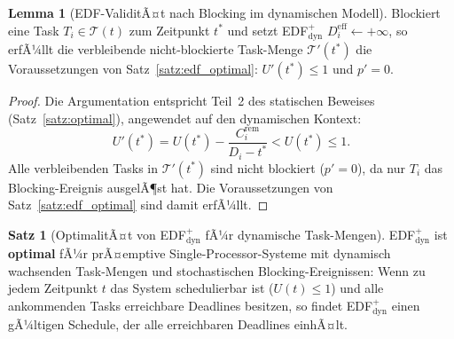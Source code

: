 ﻿\documentclass[a4paper,12pt]{article}
\theoremstyle{definition}
\newtheorem{satz}{Satz}
\newtheorem{lemma}{Lemma}
\begin{document}
	\begin{lemma}[EDF-ValiditÃ¤t nach Blocking im dynamischen Modell]
		\label{lem:blocking_dyn}
		Blockiert eine Task $T_i \in \mathcal{T}(t)$ zum Zeitpunkt $t^*$
		und setzt EDF$^+_{\mathrm{dyn}}$ $D_i^{\text{eff}} \leftarrow +\infty$,
		so erfÃ¼llt die verbleibende nicht-blockierte Task-Menge
		$\mathcal{T}'(t^*)$ die Voraussetzungen von Satz~\ref{satz:edf_optimal}:
		$U'(t^*) \le 1$ und $p' = 0$.
	\end{lemma}

	\begin{proof}
		Die Argumentation entspricht Teil~2 des statischen Beweises
		(Satz~\ref{satz:optimal}), angewendet auf den dynamischen Kontext:
		\[
		U'(t^*) = U(t^*) - \frac{C_i^{\text{rem}}}{D_i - t^*} < U(t^*) \le 1.
		\]
		Alle verbleibenden Tasks in $\mathcal{T}'(t^*)$ sind nicht blockiert
		($p' = 0$), da nur $T_i$ das Blocking-Ereignis ausgelÃ¶st hat.
		Die Voraussetzungen von Satz~\ref{satz:edf_optimal} sind damit erfÃ¼llt.
	\end{proof}

	\begin{satz}[OptimalitÃ¤t von EDF$^+_{\mathrm{dyn}}$ fÃ¼r dynamische Task-Mengen]
		\label{satz:optimal_dyn}
		EDF$^+_{\mathrm{dyn}}$ ist \textbf{optimal} fÃ¼r prÃ¤emptive Single-Processor-Systeme
		mit dynamisch wachsenden Task-Mengen und stochastischen Blocking-Ereignissen:
		Wenn zu jedem Zeitpunkt $t$ das System schedulierbar ist ($U(t) \le 1$) und alle
		ankommenden Tasks erreichbare Deadlines besitzen, so findet
		EDF$^+_{\mathrm{dyn}}$ einen gÃ¼ltigen Schedule, der alle erreichbaren Deadlines
		einhÃ¤lt.
	\end{satz}
\end{document}
